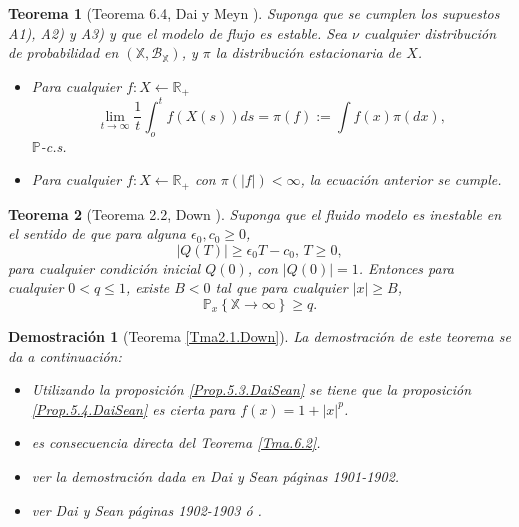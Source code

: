 \documentclass{article}
\newtheorem{Teo}{Teorema}
\newtheorem{Dem}{Demostración}
\newcommand{\rea}{\mathbb{R}}
\newcommand{\prob}{\mathbb{P}}
\begin{document}
\begin{Teo}[Teorema 6.4, Dai y Meyn \cite{DaiSean}]\label{Tma.6.4.DaiSean}
Suponga que se cumplen los supuestos A1), A2) y A3) y que el
modelo de flujo es estable. Sea $\nu$ cualquier distribuci\'on de
probabilidad en
$\left(\mathbb{X},\mathcal{B}_{\mathbb{X}}\right)$, y $\pi$ la
distribuci\'on estacionaria de $X$.
\begin{itemize}
\item[i)] Para cualquier $f:X\leftarrow\rea_{+}$
\begin{equation}
\lim_{t\rightarrow\infty}\frac{1}{t}\int_{o}^{t}f\left(X\left(s\right)\right)ds=\pi\left(f\right):=\int
f\left(x\right)\pi\left(dx\right),
\end{equation}
$\prob$-c.s.

\item[ii)] Para cualquier $f:X\leftarrow\rea_{+}$ con
$\pi\left(|f|\right)<\infty$, la ecuaci\'on anterior se cumple.
\end{itemize}
\end{Teo}

\begin{Teo}[Teorema 2.2, Down \cite{Down}]\label{Tma2.2.Down}
Suponga que el fluido modelo es inestable en el sentido de que
para alguna $\epsilon_{0},c_{0}\geq0$,
\begin{equation}\label{Eq.Inestability}
|Q\left(T\right)|\geq\epsilon_{0}T-c_{0}\textrm{,   }T\geq0,
\end{equation}
para cualquier condici\'on inicial $Q\left(0\right)$, con
$|Q\left(0\right)|=1$. Entonces para cualquier $0<q\leq1$, existe
$B<0$ tal que para cualquier $|x|\geq B$,
\begin{equation}
\prob_{x}\left\{\mathbb{X}\rightarrow\infty\right\}\geq q.
\end{equation}
\end{Teo}

\begin{Dem}[Teorema \ref{Tma2.1.Down}] La demostraci\'on de este
teorema se da a continuaci\'on:\\
\begin{itemize}
\item[i)] Utilizando la proposici\'on \ref{Prop.5.3.DaiSean} se
tiene que la proposici\'on \ref{Prop.5.4.DaiSean} es cierta para
$f\left(x\right)=1+|x|^{p}$.

\item[i)] es consecuencia directa del Teorema \ref{Tma.6.2}.

\item[iii)] ver la demostraci\'on dada en Dai y Sean
\cite{DaiSean} p\'aginas 1901-1902.

\item[iv)] ver Dai y Sean \cite{DaiSean} p\'aginas 1902-1903 \'o
\cite{MeynTweedie2}.
\end{itemize}
\end{Dem}
\end{document}
